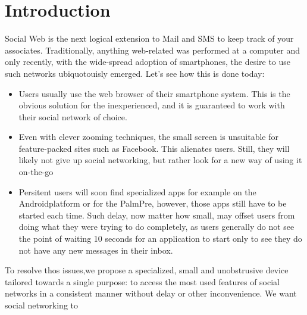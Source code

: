 %
%
%
\section{Introduction}
Social Web is the next logical extension to Mail and SMS to keep track of your associates. Traditionally, 
anything web-related was performed at a computer and only recently, with the wide-spread adoption of 
smartphones, the desire to use such networks ubiquotouisly emerged. Let's see how this is done today:
\begin{itemize}
  \item %
    Users usually 
    use the web browser of their smartphone system. This is the obvious solution for the inexperienced,
    and it is guaranteed to work with their social network of choice.
  \item Even with clever zooming techniques, the small screen is unsuitable for feature-packed sites such as Facebook\registered. 
    This alienates users. Still, they will likely not give up social networking, but rather look for a new 
    way of using it on-the-go
  \item Persitent users will soon find specialized apps for example on the Android\trademark platform or for the 
    Palm\registered Pre, however, 
    those apps still have to be started each time. Such delay, now matter how small, may offset users from doing what they were 
    trying to do completely, as users generally do not see the point of waiting 10 seconds for an application to start 
    only to see they do not have any new messages in their inbox.
\end{itemize}
To resolve thos issues,we propose a specialized, small and unobstrusive device tailored towards a single purpose: to access the 
most used features of social networks in a consistent manner without delay or other inconvenience. We want social networking to
